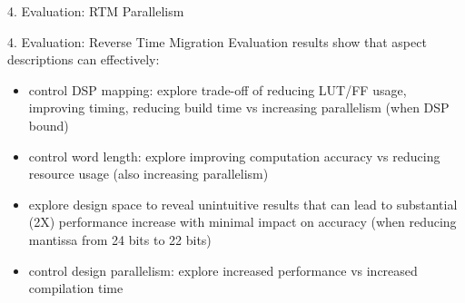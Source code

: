 \begin{frame}{4. Evaluation: RTM Parallelism}
  \begin{figure}[!h]
    \centering
  \end{figure}
\end{frame}


\begin{frame}{4. Evaluation: Reverse Time Migration}
  Evaluation results show that aspect descriptions can effectively:
  \begin{itemize}
  \item control DSP mapping: explore trade-off of reducing LUT/FF usage,
    improving timing, reducing build time vs increasing parallelism (when DSP bound)
  \item control word length: explore improving computation accuracy vs
    reducing resource usage (also increasing parallelism)
  \item explore design space to reveal unintuitive results that can
    lead to substantial (2X) performance increase with minimal impact
    on accuracy (when reducing mantissa from 24 bits to 22 bits)
  \item control design parallelism: explore increased performance vs
    increased compilation time
  \end{itemize}
\end{frame}

